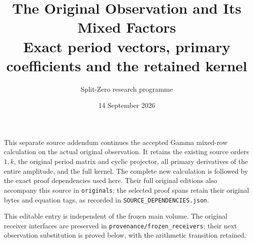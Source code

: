 \documentclass[11pt,a4paper]{article}
\title{The Original Observation and Its Mixed Factors\\[3pt]
\large Exact period vectors, primary coefficients and the retained kernel}
\author{Split-Zero research programme}
\date{14 September 2026}
\begin{document}
\maketitle
This separate source addendum continues the accepted Gamma mixed-row
calculation on the actual original observation. It retains the existing
source orders $1,k$, the original period matrix and cyclic projector,
all primary derivatives of the entire amplitude, and the full kernel.
The complete new calculation is followed by the exact proof dependencies
used here. Their full original editions also accompany this source in
\texttt{originals}; the selected proof spans retain their original bytes
and equation tags, as recorded in \texttt{SOURCE\_DEPENDENCIES.json}.

This editable entry is independent of the frozen main volume.
The original receiver interfaces are preserved in
\texttt{provenance/frozen\_receivers}; their next observation substitution
is proved below, with the arithmetic transition retained.
\tableofcontents
\clearpage

\clearpage

\clearpage
\appendix


\clearpage

\clearpage

\clearpage

\clearpage


\end{document}
